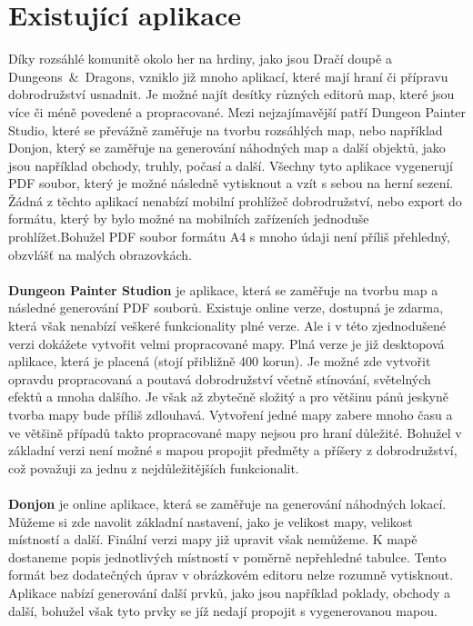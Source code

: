 \documentclass[thesis=B,czech]{resources/FITthesis}[2012/06/26]
\begin{document}
	\section{Existující aplikace}
Díky rozsáhlé komunitě okolo her na hrdiny, jako jsou Dračí doupě a Dungeons~\&~Dragons, vzniklo již mnoho aplikací, které mají hraní či přípravu dobrodružství usnadnit. Je možné najít desítky různých editorů map, které jsou více či méně povedené a propracované. Mezi nejzajímavější patří Dungeon Painter Studio, které se převážně zaměřuje na tvorbu rozsáhlých map, nebo například Donjon, který se zaměřuje na generování náhodných map a další objektů, jako jsou například obchody, truhly, počasí a další. Všechny tyto aplikace vygenerují PDF soubor, který je možné následně vytisknout a vzít s sebou na herní sezení. Žádná z těchto aplikací nenabízí mobilní prohlížeč dobrodružství, nebo export do formátu, který by bylo možné na mobilních zařízeních jednoduše prohlížet.Bohužel PDF soubor formátu A4 s mnoho údaji není příliš přehledný, obzvlášť na malých obrazovkách. \\
\\
\textbf{Dungeon Painter Studion} je aplikace, která se zaměřuje na tvorbu map a následné generování PDF souborů. Existuje online verze, dostupná je zdarma, která však nenabízí veškeré funkcionality plné verze. Ale i v této zjednodušené verzi dokážete vytvořit velmi propracované mapy. Plná verze je již desktopová aplikace, která je placená (stojí  přibližně 400 korun). Je možné zde vytvořit opravdu propracovaná a poutavá dobrodružství včetně stínování, světelných efektů a mnoha dalšího. Je však až zbytečně složitý a pro většinu pánů jeskyně tvorba mapy bude příliš zdlouhavá. Vytvoření jedné mapy zabere mnoho času a ve většině případů takto propracované mapy nejsou pro hraní důležité. Bohužel v základní verzi není možné s mapou propojit předměty a příšery z dobrodružství, což považuji za jednu z nejdůležitějších funkcionalit. \\
\\
\textbf{Donjon} je online aplikace, která se zaměřuje na generování náhodných lokací. Můžeme si zde navolit základní nastavení, jako je velikost mapy, velikost místností a další. Finální verzi mapy již upravit však nemůžeme. K mapě dostaneme popis jednotlivých místností v poměrně nepřehledné tabulce. Tento formát bez dodatečných úprav v obrázkovém editoru nelze rozumně vytisknout. Aplikace nabízí generování další prvků, jako jsou například poklady, obchody a další, bohužel však tyto prvky se jíž nedají propojit s vygenerovanou mapou. 
\end{document}
